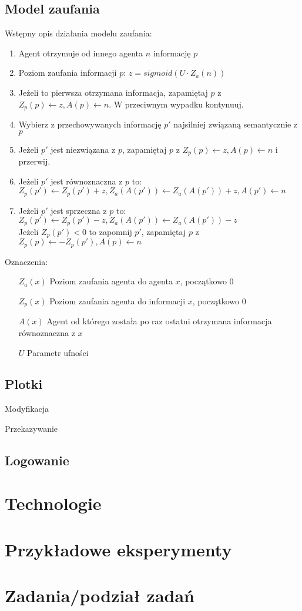\documentclass{article}
\begin{document}
	\subsection{Model zaufania}
	Wstępny opis działania modelu zaufania:
	\begin{enumerate}
		\item Agent otrzymuje od innego agenta $n$ informację $p$
		\item Poziom zaufania informacji $p$: $ z = sigmoid(U \cdot Z_a(n)) $
		\item Jeżeli to pierwsza otrzymana informacja,
		zapamiętaj $p$ z $ Z_p(p) \leftarrow z, A(p) \leftarrow n $.
		W przeciwnym wypadku kontynuuj.
		\item Wybierz z przechowywanych informację $p'$ najsilniej związaną semantycznie z $p$
		\item Jeżeli $p'$ jest niezwiązana z $p$, zapamiętaj $p$ z $ Z_p(p) \leftarrow z, A(p) \leftarrow n $ i przerwij.
		\item Jeżeli $p'$ jest równoznaczna z $p$ to:\\
		$ Z_p(p') \leftarrow Z_p(p') + z, Z_a(A(p')) \leftarrow Z_a(A(p')) + z , A(p') \leftarrow n $
		\item Jeżeli $p'$ jest sprzeczna z $p$ to:\\
		$ Z_p(p') \leftarrow Z_p(p') - z, Z_a(A(p')) \leftarrow Z_a(A(p')) - z$\\
		Jeżeli $ Z_p(p') < 0 $ to zapomnij $p'$, zapamiętaj $p$ z\\
		$ Z_p(p) \leftarrow -Z_p(p'), A(p) \leftarrow n $
	\end{enumerate}
	Oznaczenia:
	\begin{itemize}
		\item[$Z_a(x)$] Poziom zaufania agenta do agenta $x$, początkowo $0$
		\item[$Z_p(x)$] Poziom zaufania agenta do informacji $x$, początkowo $0$
		\item[$A(x)$] Agent od którego została po raz ostatni otrzymana informacja równoznaczna z $x$
		
		\item[$U$] Parametr ufności
		
	\end{itemize}
	\subsection{Plotki}
	\begin{description}
		\item{Modyfikacja}
		\item{Przekazywanie}
	\end{description}
	\subsection{Logowanie}
	\section{Technologie}
	\section{Przykładowe eksperymenty}
	\section{Zadania/podział zadań}
\end{document}
